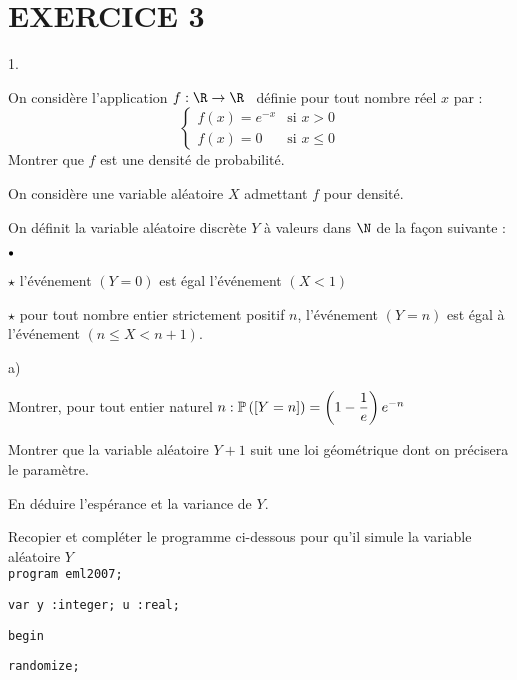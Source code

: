 \documentclass[11pt]{article}%
\begin{document}
\section*{EXERCICE 3}

\begin{noliste}{1.}
 \setlength{\itemsep}{4mm}
\item On considère l'application $f :\R\rightarrow \R$ \ définie pour
tout nombre réel $x$ par : 
\[
\left\{ 
\begin{array}{cc}
f\left( x\right) = e^{-x} & \text{si }x>0 \\
f\left( x\right) = 0 & \text{si }x\leq 0
\end{array}
\right.
\]
Montrer que $f$ est une densité de probabilité.

\hspace{-1cm}On considère une variable aléatoire $X$ admettant $f$
pour densité.

\item On définit la variable aléatoire discrète $Y$ à
valeurs dans $\N$ de la façon suivante :

\begin{noliste}{$\scriptstyle \bullet$}
\item[$\star $] l'événement $\left( Y = 0\right) $ est égal l'événement
$\left( X<1\right) $

\item[$\star $] pour tout nombre entier strictement positif $n$,
l'événement $\left( Y = n\right) $ est égal à l'événement $\left( n\leq
X<n + 1\right) $.
\end{noliste}

\begin{noliste}{a)}
 \setlength{\itemsep}{2mm}
\item Montrer, pour tout entier naturel $n :\mathbb{P}\left(\left[ { Y =
n} \right]\right)
 = \left( 1-\dfrac{1}{e}\right) e^{-n}$

\item Montrer que la variable aléatoire $Y + 1$ suit une loi
géométrique dont on précisera le paramètre.

En déduire l'espérance et la variance de $Y$.

\item Recopier et compléter le programme ci-dessous pour qu'il simule
la
variable aléatoire $Y$\\
\texttt{program eml2007;}

\texttt{var y :integer; u :real;}

\texttt{begin}

\texttt{\hspace{1cm}randomize;}


\end{noliste}
\end{noliste}
\end{document}
